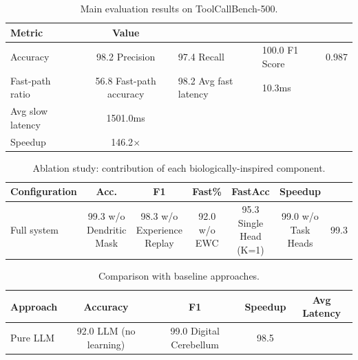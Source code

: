 \begin{table}[h]
\centering
\caption{Main evaluation results on ToolCallBench-500.}
\label{tab:main_results}
\begin{tabular}{lc}
\toprule
Metric & Value \\
\midrule
Accuracy & 98.2%
Precision & 97.4%
Recall & 100.0%
F1 Score & 0.987 \\
\midrule
Fast-path ratio & 56.8%
Fast-path accuracy & 98.2%
Avg fast latency & 10.3ms \\
Avg slow latency & 1501.0ms \\
Speedup & 146.2$\times$ \\
\bottomrule
\end{tabular}
\end{table}

\begin{table}[h]
\centering
\caption{Ablation study: contribution of each biologically-inspired component.}
\label{tab:ablation}
\begin{tabular}{lccccc}
\toprule
Configuration & Acc. & F1 & Fast\% & FastAcc & Speedup \\
\midrule
Full system & 99.3%
w/o Dendritic Mask & 98.3%
w/o Experience Replay & 92.0%
w/o EWC & 95.3%
Single Head (K=1) & 99.0%
w/o Task Heads & 99.3%
\bottomrule
\end{tabular}
\end{table}

\begin{table}[h]
\centering
\caption{Comparison with baseline approaches.}
\label{tab:baseline}
\begin{tabular}{lcccc}
\toprule
Approach & Accuracy & F1 & Speedup & Avg Latency \\
\midrule
Pure LLM & 92.0%
LLM (no learning) & 99.0%
Digital Cerebellum & 98.5%
\bottomrule
\end{tabular}
\end{table}